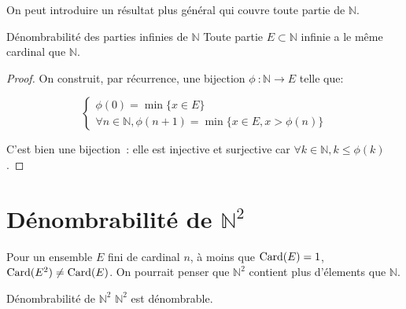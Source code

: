 \documentclass[a4paper,french]{memoir}
\begin{document}
On peut introduire un résultat plus général qui couvre toute partie de $\mathbb{N}$. 

\begin{theoremb}{Dénombrabilité des parties infinies de $\mathbb{N}$}{}
	Toute partie $E \subset \mathbb{N}$ infinie a le même cardinal que $\mathbb{N}$. 
\end{theoremb}

\begin{proof}
	On construit, par récurrence, une bijection $\phi~: \mathbb{N} \to E$ telle que: 
	
	\[\left\lbrace \begin{array}{c}
	\phi(0) = \min \{x \in E\} \\
	\forall n \in \mathbb{N}, \phi(n+1) = \min \{x \in E, x > \phi(n) \}
	\end{array} \right.\]
	
	C'est bien une bijection~: elle est injective et surjective car $\forall k \in \mathbb{N}, k \leq \phi(k)$. 
\end{proof}

\section{\texorpdfstring{Dénombrabilité de $\mathbb{N}^2$}{Dénombrabilité de N²}}

Pour un ensemble $E$ fini de cardinal $n$, à moins que $\operatorname{Card}(E) = 1$, $\operatorname{Card}(E^2) \neq \operatorname{Card}(E)$. On pourrait penser que $\mathbb{N}^2 $ contient plus d'élements que $\mathbb{N}$. 

\begin{theoremb}{Dénombrabilité de $\mathbb{N}^2$}{}
	$\mathbb{N}^2$ est dénombrable. 
\end{theoremb}
\end{document}
